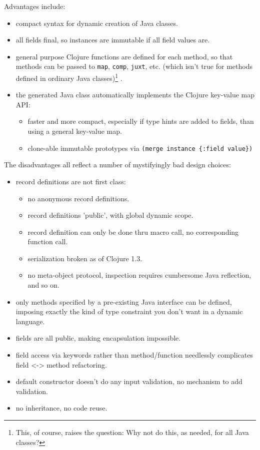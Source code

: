 \documentclass[10pt,openany]{article}
\numberwithin{definition}{section}
\numberwithin{example}{section}
\numberwithin{equation}{section}
\numberwithin{figure}{section}
\begin{document}
Advantages include:
\begin{itemize}
\item compact syntax for dynamic creation of Java classes. 
\item all fields final, so instances are immutable if all field values are. 
\item general purpose Clojure functions are defined for each method, so
that methods can be passed to \texttt{map}, \texttt{comp}, \texttt{juxt},
etc. (which isn't true for methods defined in ordinary Java
classes)\footnote{This,  of course, raises the question: Why not do
this, as needed, for all Java classes?} .
\item the generated Java class automatically implements the Clojure key-value
map API:

\begin{itemize}
\item faster and more compact, especially if type hints are added to fields,
than using a general key-value map.
\item clone-able immutable prototypes via \texttt{(merge instance \{:field
value\})}
\end{itemize}
\end{itemize}
The disadvantages all reflect a number of mystifyingly bad design
choices:
\begin{itemize}
\item record definitions are not first class:

\begin{itemize}
\item no anonymous record definitions.
\item record definitions 'public', with global dynamic scope.
\item record definition can only be done thru macro call, no corresponding
function call.
\item serialization broken as of Clojure 1.3.
\item no meta-object protocol, inspection requires cumbersome Java reflection,
and so on.
\end{itemize}
\item only methods specified by a pre-existing Java interface can be defined,
imposing exactly the kind of type constraint you don't want in a dynamic
language.
\item fields are all public, making encapsulation impossible. 
\item field access via keywords rather than method/function needlessly complicates
field <-> method refactoring.
\item default constructor doesn't do any input validation, no mechanism
to add validation.
\item no inheritance, no code reuse.\end{itemize}
\end{document}
